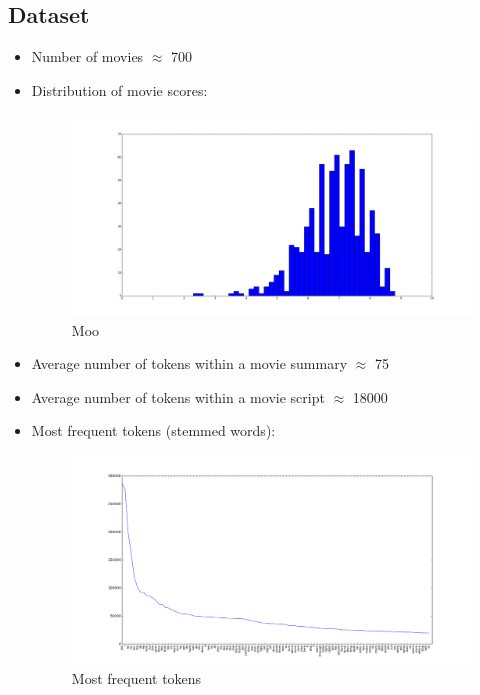 \documentclass[a4paper,10pt]{report}
\begin{document}
\subsection*{Dataset}

\begin{itemize}
	\item Number of movies $\approx$ 700
	\item Distribution of movie scores:
	
	\begin{figure}[ht!]
		\centering
		\includegraphics[width=\textwidth]{scores_histogram.png}
		
		\caption{Moo}
	\end{figure}

	\item Average number of tokens within a movie summary $\approx$ 75
	\item Average number of tokens within a movie script $\approx$ 18000
	\item Most frequent tokens (stemmed words):
	
	\begin{figure}[ht!]
		\centering
		\includegraphics[width=\textwidth]{most_frequent_tokens_global.png}
		
		\caption{Most frequent tokens}
	\end{figure}
\end{itemize}
\end{document}

